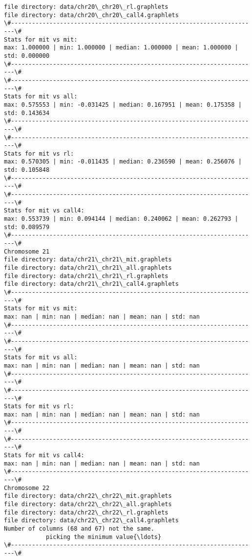\documentclass[11pt]{article}
\begin{document}
\begin{Verbatim}[commandchars=\\\{\}]
file directory: data/chr20\_chr20\_rl.graphlets
file directory: data/chr20\_chr20\_call4.graphlets
\#-----------------------------------------------------------------------\#
Stats for mit vs mit: 
max: 1.000000 | min: 1.000000 | median: 1.000000 | mean: 1.000000 | std: 0.000000
\#-----------------------------------------------------------------------\#
\#-----------------------------------------------------------------------\#
Stats for mit vs all: 
max: 0.575553 | min: -0.031425 | median: 0.167951 | mean: 0.175358 | std: 0.143634
\#-----------------------------------------------------------------------\#
\#-----------------------------------------------------------------------\#
Stats for mit vs rl: 
max: 0.570305 | min: -0.011435 | median: 0.236590 | mean: 0.256076 | std: 0.105848
\#-----------------------------------------------------------------------\#
\#-----------------------------------------------------------------------\#
Stats for mit vs call4: 
max: 0.553739 | min: 0.094144 | median: 0.240062 | mean: 0.262793 | std: 0.089579
\#-----------------------------------------------------------------------\#
Chromosome 21
file directory: data/chr21\_chr21\_mit.graphlets
file directory: data/chr21\_chr21\_all.graphlets
file directory: data/chr21\_chr21\_rl.graphlets
file directory: data/chr21\_chr21\_call4.graphlets
\#-----------------------------------------------------------------------\#
Stats for mit vs mit: 
max: nan | min: nan | median: nan | mean: nan | std: nan
\#-----------------------------------------------------------------------\#
\#-----------------------------------------------------------------------\#
Stats for mit vs all: 
max: nan | min: nan | median: nan | mean: nan | std: nan
\#-----------------------------------------------------------------------\#
\#-----------------------------------------------------------------------\#
Stats for mit vs rl: 
max: nan | min: nan | median: nan | mean: nan | std: nan
\#-----------------------------------------------------------------------\#
\#-----------------------------------------------------------------------\#
Stats for mit vs call4: 
max: nan | min: nan | median: nan | mean: nan | std: nan
\#-----------------------------------------------------------------------\#
Chromosome 22
file directory: data/chr22\_chr22\_mit.graphlets
file directory: data/chr22\_chr22\_all.graphlets
file directory: data/chr22\_chr22\_rl.graphlets
file directory: data/chr22\_chr22\_call4.graphlets
Number of columns (68 and 67) not the same.
            picking the minimum value{\ldots}
\#-----------------------------------------------------------------------\#

\end{Verbatim}
\end{document}
